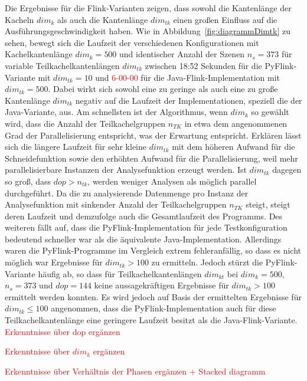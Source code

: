 Die Ergebnisse für die Flink-Varianten zeigen, dass sowohl die Kantenlänge der Kacheln $dim_{k}$ als auch die Kantenlänge $dim_{tk}$ einen großen Einfluss auf die Ausführungsgeschwindigkeit haben. Wie in Abbildung~\ref{fig:diagrammDimtk} zu sehen, bewegt sich die Laufzeit der verschiedenen Konfigurationen mit Kachelkantenlänge $dim_k = 500$ und identischer Anzahl der Szenen $n_s = 373$ für variable Teilkachelkantenlängen $dim_{tk}$ zwischen 18:52 Sekunden für die PyFlink-Variante mit $dim_{tk} = 10$ und \textcolor{red}{6-00-00} für die Java-Flink-Implementation mit $dim_{tk} = 500$. Dabei wirkt sich sowohl eine zu geringe als auch eine zu große Kantenlänge $dim_{tk}$ negativ auf die Laufzeit der Implementationen, speziell die der Java-Variante, aus. Am schnellsten ist der Algorithmus, wenn $dim_k$ so gewählt wird, dass die Anzahl der Teilkachelgruppen $n_{TK}$ in etwa dem angenommenen Grad der Parallelisierung entspricht, was der Erwartung entspricht. Erklären lässt sich die längere Laufzeit für sehr kleine $dim_{tk}$ mit dem höheren Aufwand für die Schneidefunktion sowie den erhöhten Aufwand für die Parallelisierung, weil mehr parallelisierbare Instanzen der Analysefunktion erzeugt werden. Ist $dim_{tk}$ dagegen so groß, dass $dop > n_{tk}$, werden weniger Analysen als möglich parallel durchgeführt. Da die zu analysierende Datenmenge pro Instanz der Analysefunktion mit sinkender Anzahl der Teilkachelgruppen $n_{TK}$ steigt, steigt deren Laufzeit und demzufolge auch die Gesamtlaufzeit des Programms. Des weiteren fällt auf, dass die PyFlink-Implementation für jede Testkonfiguration bedeutend schneller war als die äquivalente Java-Implementation. Allerdings waren die PyFlink-Programme im Vergleich extrem fehleranfällig, so dass es nicht möglich war Ergebnisse für $dim_{tk} > 100$ zu ermitteln. Jedoch stürzt die PyFlink-Variante häufig ab, so dass für Teilkachelkantenlängen $dim_{kt}$ bei $dim_k = 500$, $n_s = 373$ und $dop=144$ keine aussagekräftigen Ergebnisse für $dim_{tk} > 100$ ermittelt werden konnten. Es wird jedoch auf Basis der ermittelten Ergebnisse für $dim_{tk} \leq 100$ angenommen, dass die PyFlink-Implementation auch für diese Teilkachelkantenlänge eine geringere Laufzeit besitzt als die Java-Flink-Variante.
\textcolor{red}{Erkenntnisse über dop ergänzen}

\textcolor{red}{Erkenntnisse über $dim_k$ ergänzen}

\textcolor{red}{Erkenntnisse über Verhältnis der Phasen ergänzen + Stacked diagramm}



